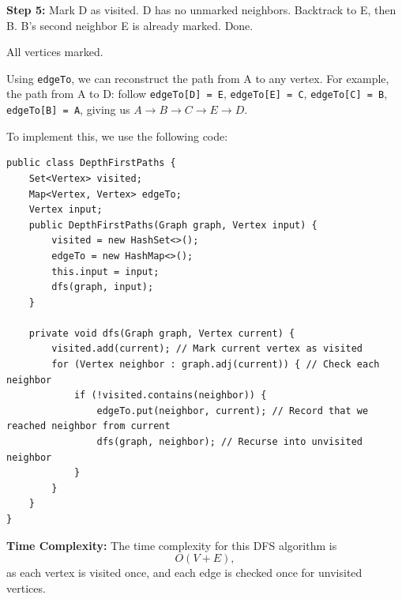 \textbf{Step 5:} Mark D as visited. D has no unmarked neighbors. Backtrack to E, then B. B's second neighbor E is already marked. Done.

\begin{center}

{\small All vertices marked.}
\end{center}

Using \texttt{edgeTo}, we can reconstruct the path from A to any vertex. For example, the path from A to D: follow \texttt{edgeTo[D] = E}, \texttt{edgeTo[E] = C}, \texttt{edgeTo[C] = B}, \texttt{edgeTo[B] = A}, giving us $A \rightarrow B \rightarrow C \rightarrow E \rightarrow D$.

To implement this, we use the following code:



\begin{verbatim}
public class DepthFirstPaths {
    Set<Vertex> visited;
    Map<Vertex, Vertex> edgeTo;
    Vertex input;
    public DepthFirstPaths(Graph graph, Vertex input) {
        visited = new HashSet<>();
        edgeTo = new HashMap<>();
        this.input = input;
        dfs(graph, input);
    }
    
    private void dfs(Graph graph, Vertex current) {
        visited.add(current); // Mark current vertex as visited
        for (Vertex neighbor : graph.adj(current)) { // Check each neighbor
            if (!visited.contains(neighbor)) {
                edgeTo.put(neighbor, current); // Record that we reached neighbor from current
                dfs(graph, neighbor); // Recurse into unvisited neighbor
            }
        }
    }
}
\end{verbatim}



\textbf{Time Complexity:} The time complexity for this DFS algorithm is
\[
O(V + E),
\]
as each vertex is visited once, and each edge is checked once for unvisited vertices.


